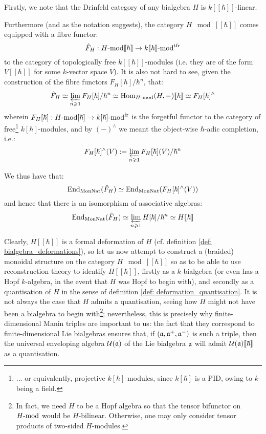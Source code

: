         \begin{remark} \label{remark: formal_properties_of_drinfeld_categories}
            Firstly, we note that the Drinfeld category of any bialgebra $H$ is $k[\![\hbar]\!]$-linear.
            
            Furthermore (and as the notation suggests), the category $H\mod[\![\hbar]\!]$ comes equipped with a fibre functor:
                $$\hat{F}_H: H\mod[\![\hbar]\!] \to k[\![\hbar]\!]\mod^{\tfr}$$
            to the category of topologically free $k[\![\hbar]\!]$-modules (i.e. they are of the form $V[\![\hbar]\!]$ for some $k$-vector space $V$). It is also not hard to see, given the construction of the fibre functors $F_H[\hbar]/\hbar^n$, that:
                $$\hat{F}_H \cong \projlim_{n \geq 1} F_H[\hbar]/\hbar^n \cong \Hom_{H\mod}(H, -)[\![\hbar]\!] \cong F_H[\hbar]^{\wedge}$$
            wherein $F_H[\hbar]: H\mod[\hbar] \to k[\hbar]\mod^{\fr}$ is the forgetful functor to the category of free\footnote{... or equivalently, projective $k[\hbar]$-modules, since $k[\hbar]$ is a PID, owing to $k$ being a field.} $k[\hbar]$-modules, and by $(-)^{\wedge}$ we meant the object-wise $\hbar$-adic completion, i.e.:
                $$F_H[\hbar]^{\wedge}(V) := \projlim_{n \geq 1} F_H[\hbar](V)/\hbar^n$$
            
            We thus have that:
                $$\End_{\Mon\Nat}(\hat{F}_H) \cong \End_{\Mon\Nat}(F_H[\hbar]^{\wedge}(V))$$
            and hence that there is an isomorphism of associative algebras:
                $$\End_{\Mon\Nat}(\hat{F}_H) \cong \projlim_{n \geq 1} H[\hbar]/\hbar^n \cong H[\![\hbar]\!]$$
        \end{remark}
        Clearly, $H[\![\hbar]\!]$ is a formal deformation of $H$ (cf. definition \ref{def: bialgebra_deformations}), so let us now attempt to construct a (braided) monoidal structure on the category $H\mod[\![\hbar]\!]$ so as to be able to use reconstruction theory to identify $H[\![\hbar]\!]$, firstly as a $k$-bialgebra (or even has a Hopf $k$-algebra, in the event that $H$ was Hopf to begin with), and secondly as a quantisation of $H$ in the sense of definition \ref{def: deformation_quantisation}. It is not always the case that $H$ admits a quantisation, seeing how $H$ might not have been a bialgebra to begin with\footnote{In fact, we need $H$ to be a Hopf algebra so that the tensor bifunctor on $H\mod$ would be $H$-bilinear. Otherwise, one may only consider tensor products of two-sided $H$-modules.}; nevertheless, this is precisely why finite-dimensional Manin triples are important to us: the fact that they correspond to finite-dimensional Lie bialgebras ensures that, if $(\a, \a^+, \a^-)$ is such a triple, then the universal enveloping algebra $\calU(\a)$ of the Lie bialgebra $\a$ will admit $\calU(\a)[\![\hbar]\!]$ as a quantisation.
        